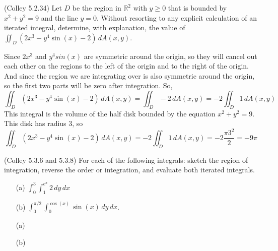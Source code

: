 \documentclass[11pt,letterpaper,cm]{nupset}
\begin{document}
\begin{problem}[Exercise 7] (Colley 5.2.34) Let $D$ be the region in $\mathbb{R}^2$ with $y\geq 0$ that is bounded by $x^2+y^2=9$ and the line $y=0$. Without resorting to any explicit calculation of an iterated integral, determine, with explanation, the value of $\displaystyle \iint_D (2x^3-y^4\sin(x)-2)\,dA(x,y)$.
\end{problem}
\begin{solution}
	Since $2x^3$ and $y^4sin(x)$ are symmetric around the origin, so they will cancel out each other on the regions to the left of the origin and to the right of the origin. And since the region we are integrating over is also symmetric around the origin, so the first two parts will be zero after integration. So, $$ \iint_D (2x^3-y^4\sin(x)-2)\,dA(x,y)=\iint_D-2\,dA(x,y)=-2\iint_D 1\,dA(x,y)$$
	This integral is the volume of the half disk bounded by the equation $x^2+y^2=9$. This disk has radius 3, so 
	$$\iint_D (2x^3-y^4\sin(x)-2)\,dA(x,y)=-2\iint_D 1\,dA(x,y)=-2\frac{\pi 3^2}{2}=-9\pi$$
\end{solution}
\newpage

\begin{problem}[Exercise 8] (Colley 5.3.6 and 5.3.8) For each of the following integrals: sketch the region of integration, reverse the order or integration, and evaluate both iterated integrals. 
	\begin{itemize}
		\item[(a)] $\displaystyle\int_0^3 \int_1^{e^x} 2\,dy\,dx$
		\item[(b)] $\displaystyle\int_0^{\pi/2}\int_0^{\cos(x)}\sin(x)\,dy\,dx$.
	\end{itemize}
\end{problem}
\begin{solution}
	\begin{itemize}
		\item[(a)]
		\item[(b)]
	\end{itemize}
\end{solution}
\newpage
\end{document}
